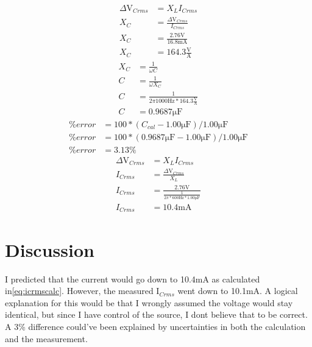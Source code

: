 \documentclass{report}
\begin{document}
\begin{align}
    \Delta\si{\volt}_{Crms}&=X_{L}I_{Crms}\nonumber\\
    X_{C}&=\frac{\Delta\si{\volt}_{Crms}}{I_{Crms}}\nonumber\\
    X_{C}&=\frac{2.76\si{\volt}}{16.8\si{\milli\ampere}}\nonumber\\
    X_{C}&=164.3\frac{\si{\volt}}{\si{\ampere}}\label{eq:xccalc}
\end{align}
\begin{align}
    X_{C}&=\frac{1}{\omega C}\nonumber\\
    C&=\frac{1}{\omega X_{C}}\nonumber\\
    C&=\frac{1}{2\pi1000\si{\hertz}*164.3\frac{\si{\volt}}{\si{\ampere}}}\nonumber\\
    C&=0.9687\si{\micro\farad}
\end{align}
\begin{align}
    \%error&=100 * (C_{cal} - 1.00\si{\micro\farad})/1.00\si{\micro\farad}\nonumber\\
    \%error&=100 * (0.9687\si{\micro\farad} - 1.00\si{\micro\farad})/1.00\si{\micro\farad}\nonumber\\
    \%error&=3.13\%
\end{align}
\begin{align}
    \Delta\si{\volt}_{Crms}&=X_{L}I_{Crms}\nonumber\\
    I_{Crms}&=\frac{\Delta\si{\volt}_{Crms}}{X_{L}}\nonumber\\
    I_{Crms}&=\frac{2.76\si{\volt}}{\frac{1}{2\pi*600\si{\hertz}*1.00\si{\micro\farad}}}\nonumber\\
    I_{Crms}&=10.4\si{\milli\ampere}\label{eq:icrmscalc}
\end{align}

\section{Discussion}

I predicted that the current would go down to 10.4\si{\milli\ampere} as calculated in\eqref{eq:icrmscalc}. However, the measured I$_{Crms}$ went down to 10.1mA. A logical explanation for this would be that I wrongly assumed the voltage would stay identical, but since I have control of the source, I dont believe that to be correct. A 3\% difference could've been explained by uncertainties in both the calculation and the measurement.
\end{document}
